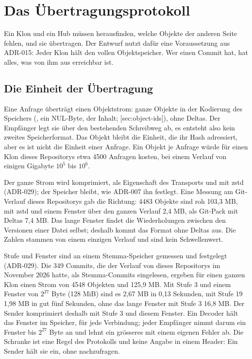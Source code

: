 \section[sec:transfer]{Das Übertragungsprotokoll}

Ein Klon und ein Hub müssen herausfinden, welche Objekte der anderen Seite fehlen, und sie
übertragen.
Der Entwurf nutzt dafür eine Voraussetzung aus ADR-015: Jeder Klon hält den vollen
Objektspeicher.
Wer einen Commit hat, hat alles, was von ihm aus erreichbar ist.

\subsection{Die Einheit der Übertragung}

Eine Anfrage überträgt einen Objektstrom: ganze Objekte in der Kodierung des Speichers
(, ein NUL-Byte, der Inhalt; [sec:object-ids]), ohne Deltas.
Der Empfänger legt sie über den bestehenden Schreibweg ab, es entsteht also kein zweites
Speicherformat.
Das Objekt bleibt die Einheit, die ihr Hash adressiert, aber es ist nicht die Einheit einer
Anfrage.
Ein Objekt je Anfrage würde für einen Klon dieses Repositorys etwa 4500 Anfragen kosten, bei
einem Verlauf von einigen Gigabyte $10^5$ bis $10^6$.

Der ganze Strom wird komprimiert, als Eigenschaft des Transports und mit zstd (ADR-029); der
Speicher bleibt, wie ADR-007 ihn festlegt.
Eine Messung am Git-Verlauf dieses Repositorys gab die Richtung: 4483 Objekte sind roh
103,3 MB, mit zstd und einem Fenster über den ganzen Verlauf 2,4 MB, als Git-Pack mit Deltas
7,4 MB.
Das lange Fenster findet die Wiederholungen zwischen den Versionen einer Datei selbst; deshalb
kommt das Format ohne Deltas aus.
Die Zahlen stammen von einem einzigen Verlauf und sind kein Schwellenwert.

Stufe und Fenster sind an einem Stemma-Speicher gemessen und festgelegt (ADR-029).
Die 349 Commits, die der Verlauf von  dieses Repositorys im November 2026 hatte,
als Stemma-Commits eingelesen, ergeben für einen ganzen Klon einen Strom von 4548 Objekten
und 125,9 MB.
Mit Stufe 3 und einem Fenster von $2^{27}$ Byte (128 MiB) sind es 2,67 MB in 0,13 Sekunden,
mit Stufe 19 1,98 MB in gut fünf Sekunden, ohne das lange Fenster mit Stufe 3 16,8 MB.
Der Sender komprimiert deshalb mit Stufe 3 und diesem Fenster.
Ein Decoder hält das Fenster im Speicher, für jede Verbindung; jeder Empfänger nimmt darum ein
Fenster bis $2^{27}$ Byte an und lehnt ein grösseres mit einem eigenen Fehler ab.
Die Schranke ist eine Regel des Protokolls und keine Angabe in einem Header: Ein Sender hält
sie ein, ohne nachzufragen.

